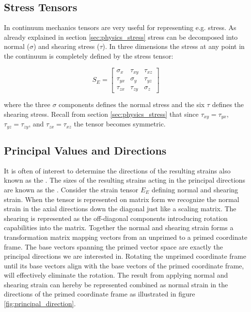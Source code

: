 \subsection{Stress Tensors}
In continuum mechanics tensors are very useful for representing
e.g. stress. As already explained in section \vref{sec:physics_stress}
stress can be decomposed into normal ($\sigma$) and 
shearing stress ($\tau$). In three dimensions the stress at any point
in the continuum is completely defined by the stress tensor:

\begin{equation}
\label{eq:stress_tensor}
  S_E = 
  \left[{\begin{matrix} 
        \sigma_x & \tau_{xy} & \tau_{xz} \\ 
        \tau_{yx} & \sigma_y & \tau_{yz} \\ 
        \tau_{zx} & \tau_{zy} & \sigma_z 
      \end{matrix}}\right]
\end{equation}

where the three $\sigma$ components defines the normal stress and the
six $\tau$ defines the shearing stress. Recall from section
\vref{sec:physics_stress} that
since $\tau_{xy} = \tau_{yx}$, $\tau_{yz} = \tau_{zy}$, and $\tau_{zx} =
\tau_{xz}$ the tensor becomes symmetric.


\subsection{Principal Values and Directions}
\label{sec:principal_values_and_directions}
It is often of interest to determine the directions of the resulting 
strains also known as the . The sizes of the resulting
strains acting in the principal directions are known as the
. 
Consider the
strain tensor $E_E$ defining normal and shearing strain. When the
tensor is represented on matrix form we recognize the normal strain
in the axial directions down the diagonal just like a scaling matrix. The shearing is
represented as the off-diagonal components introducing rotation
capabilities into the matrix. Together the normal and shearing strain
forms a transformation matrix mapping vectors from an unprimed to a
primed coordinate frame. The base vectors spanning the primed vector space are
exactly the principal directions we are interested in. Rotating the
unprimed coordinate frame until its base vectors align with the base vectors of the
primed coordinate frame, will effectively eliminate the rotation. 
The result from applying normal and shearing strain can hereby be
represented combined as normal strain in the directions of the primed
coordinate frame as illustrated in figure \vref{fig:principal_direction}.

